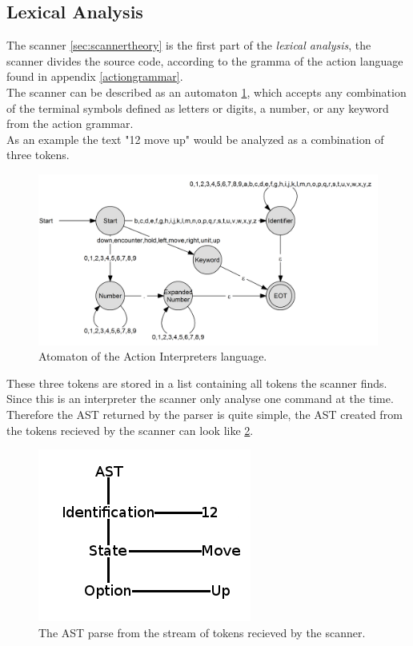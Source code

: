 \subsection{Lexical Analysis}
The scanner \ref{sec:scannertheory} is the first part of the \textit{lexical analysis}, the scanner divides the source code, according to the gramma of the action language found in appendix \ref{actiongrammar}.\\
The scanner can be described as an automaton \ref{pic:action_atomaton}, which accepts any combination of the terminal symbols defined as letters or digits, a number, or any keyword from the action grammar.\\
As an example the text "12 move up" would be analyzed as a combination of three tokens.\\

\begin{figure}[h]
\begin{center}
\includegraphics[scale=0.15]{Images/actioninterpreter/ai_automaton.png}
\caption{Atomaton of the Action Interpreters language.}
\label{pic:action_atomaton}
\end{center}
\end{figure}

These three tokens are stored in a list containing all tokens the scanner finds. Since this is an interpreter the scanner only analyse one command at the time.\\
Therefore the AST returned by the parser is quite simple, the AST created from the tokens recieved by the scanner can look like \ref{pic:ai_parser_ast}.

\begin{figure}[h]
\begin{center}
\includegraphics[scale=0.5]{Images/actioninterpreter/AST.png}
\end{center}
\caption{The AST parse from the stream of tokens recieved by the scanner.}
\label{pic:ai_parser_ast}
\end{figure}

